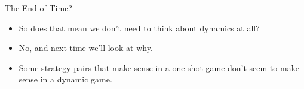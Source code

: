 \documentclass[
  ignorenonframetext,
]{beamer}
\providecommand{\tightlist}{%
  \setlength{\itemsep}{0pt}\setlength{\parskip}{0pt}}
\begin{document}
\begin{frame}{The End of Time?}
\protect\hypertarget{the-end-of-time}{}
\begin{itemize}
\tightlist
\item
  So does that mean we don't need to think about dynamics at all?
\item
  No, and next time we'll look at why.
\item
  Some strategy pairs that make sense in a one-shot game don't seem to
  make sense in a dynamic game.
\end{itemize}
\end{frame}
\end{document}
